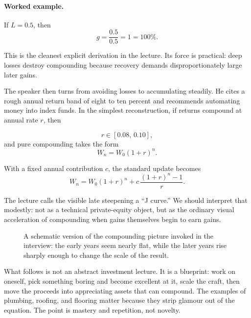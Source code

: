 \paragraph{Worked example.} If $L=0.5$, then
\begin{equation}
g = \frac{0.5}{0.5} = 1 = 100\%.
\end{equation}

This is the cleanest explicit derivation in the lecture. Its force is practical: deep losses destroy compounding because recovery demands disproportionately large later gains.

The speaker then turns from avoiding losses to accumulating steadily. He cites a rough annual return band of eight to ten percent and recommends automating money into index funds. In the simplest reconstruction, if returns compound at annual rate $r$, then

\begin{equation}
r \in [0.08,\,0.10],
\end{equation}
and pure compounding takes the form
\begin{equation}
W_n = W_0(1+r)^n.
\end{equation}

With a fixed annual contribution $c$, the standard update becomes
\begin{equation}
W_n = W_0(1+r)^n + c\,\frac{(1+r)^n-1}{r}.
\end{equation}

The lecture calls the visible late steepening a ``J curve.'' We should interpret that modestly: not as a technical private-equity object, but as the ordinary visual acceleration of compounding when gains themselves begin to earn gains.

\begin{figure}[h]
\centering
{}

\smallskip
{\small A schematic version of the compounding picture invoked in the interview: the early years seem nearly flat, while the later years rise sharply enough to change the scale of the result.}
\end{figure}

What follows is not an abstract investment lecture. It is a blueprint: work on oneself, pick something boring and become excellent at it, scale the craft, then move the proceeds into appreciating assets that can compound. The examples of plumbing, roofing, and flooring matter because they strip glamour out of the equation. The point is mastery and repetition, not novelty.

